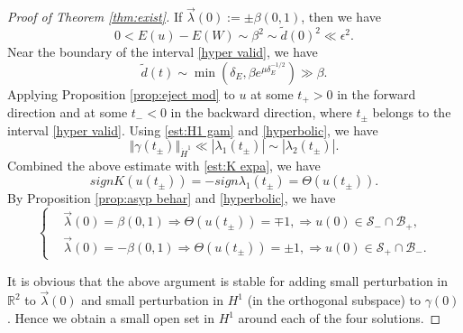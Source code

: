 \documentclass[reqno, 11pt]{amsart}
\numberwithin{equation}{section}
\newcommand{\R}{\mathbb{R}}
\theoremstyle{plain}
\theoremstyle{definition}
\numberwithin{equation}{section}
\numberwithin{theorem}{section}
\numberwithin{equation}{section}
\numberwithin{equation}{section}
\numberwithin{theorem}{section}
\begin{document}
\begin{proof}[Proof of Theorem \ref{thm:exist}]
		If $\vec{\lambda}(0):=\pm\beta(0,1)$, then we have
		\begin{equation*}
		0<E(u)-E(W)\sim \beta^2 \sim \widetilde{d}(0)^2\ll \epsilon^2.
		\end{equation*}
		Near the boundary of the interval \eqref{hyper valid}, we have
		\begin{equation*}
		\widetilde{d}(t)\sim \min\left(\delta_{E},\beta e^{\mu \delta_{E}^{-1/2}} \right)\gg \beta.
		\end{equation*}
		Applying Proposition \ref{prop:eject mod} to $u$ at some $t_{+}>0$ in the forward direction and at some $t_{-}<0$ in the backward direction, where $t_{\pm}$ belongs to the interval \eqref{hyper valid}. Using \eqref{est:H1 gam} and \eqref{hyperbolic}, we have
		\begin{equation*}
		\Vert \gamma(t_{\pm}) \Vert_{\dot H^1} \ll |\lambda_{1}(t_{\pm})| \sim |\lambda_{2}(t_{\pm})|.
		\end{equation*}
		Combined the above estimate with \eqref{est:K expa}, we have
		\begin{equation*}
		sign K(u(t_{\pm}))=-sign \lambda_{1}(t_{\pm})=\Theta(u(t_{\pm})).
		\end{equation*}
		By Proposition \ref{prop:asyp behar} and \eqref{hyperbolic}, we have
		\begin{equation*}
		\left\{\begin{aligned}
		&\vec{\lambda}(0)=\beta(0,1) \Longrightarrow \Theta(u(t_{\pm}))=\mp 1, \Longrightarrow u(0)\in \mathcal{S}_{-}\cap \mathcal{B}_{+},\\
		&\vec{\lambda}(0)=-\beta(0,1) \Longrightarrow \Theta(u(t_{\pm}))=\pm 1, \Longrightarrow u(0)\in \mathcal{S}_{+}\cap \mathcal{B}_{-}. \end{aligned}\right.
		\end{equation*}
		
		It is obvious that the above argument is stable for adding small perturbation in $\R^2$ to $\vec{\lambda}(0)$ and small perturbation in $H^1$ (in the orthogonal subspace) to $\gamma(0)$. Hence we obtain a small open set in $H^1$ around each of the four solutions.
	\end{proof}	
	
	
	
\end{document}
